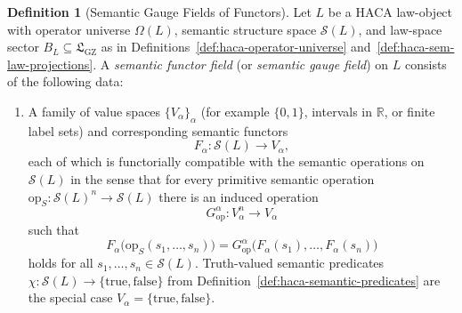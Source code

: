 \documentclass[11pt]{book}
\theoremstyle{plain}
\theoremstyle{definition}
\newtheorem{definition}[theorem]{Definition}
\theoremstyle{remark}
\newcommand{\GZLS}{\ensuremath{\mathfrak{L}_{\mathrm{GZ}}}}       \newcommand{\GZLT}{\ensuremath{M_{!w}}}                           \newcommand{\GZLOC}{\ensuremath{A_M}}                             \newcommand{\GZLC}{\ensuremath{\omega_{\mathrm{law}}}}            \newcommand{\GZLCurv}{\ensuremath{\mathcal{F}_{\mathrm{law}}}}
\begin{document}
\begin{definition}[Semantic Gauge Fields of Functors]
\label{def:semantic-gauge-field}
Let $L$ be a HACA law-object with operator universe $\Omega(L)$, semantic
structure space $\mathcal{S}(L)$, and law-space sector $B_L\subseteq\GZLS$
as in Definitions~\ref{def:haca-operator-universe}
and~\ref{def:haca-sem-law-projections}. A \emph{semantic functor field}
(or \emph{semantic gauge field}) on $L$ consists of the following data:
\begin{enumerate}
  \item A family of value spaces $\{V_\alpha\}_\alpha$ (for example
        $\{0,1\}$, intervals in $\mathbb{R}$, or finite label sets) and
        corresponding semantic functors
        \[
          F_\alpha : \mathcal{S}(L)\longrightarrow V_\alpha,
        \]
        each of which is functorially compatible with the semantic
        operations on $\mathcal{S}(L)$ in the sense that for every
        primitive semantic operation
        $\mathrm{op}_S : \mathcal{S}(L)^n\to\mathcal{S}(L)$ there is an
        induced operation
        \[
          G_{\mathrm{op}}^\alpha : V_\alpha^n\to V_\alpha
        \]
        such that
        \[
          F_\alpha\bigl(\mathrm{op}_S(s_1,\dots,s_n)\bigr)
          =
          G_{\mathrm{op}}^\alpha\bigl(F_\alpha(s_1),\dots,F_\alpha(s_n)\bigr)
        \]
        holds for all $s_1,\dots,s_n\in\mathcal{S}(L)$.
        Truth-valued semantic predicates
        $\chi:\mathcal{S}(L)\to\{\mathrm{true},\mathrm{false}\}$ from
        Definition~\ref{def:haca-semantic-predicates} are the special
        case $V_\alpha=\{\mathrm{true},\mathrm{false}\}$.


\end{enumerate}
\end{definition}
\end{document}
